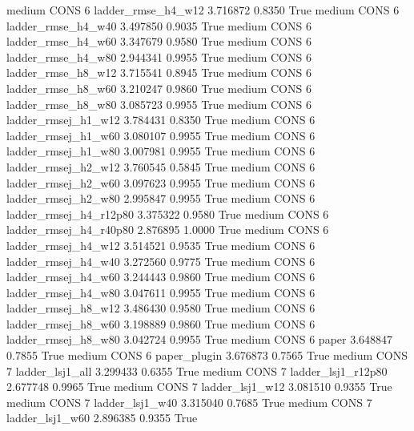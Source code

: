     medium     CONS                 6     ladder_rmse_h4_w12   3.716872      0.8350    True
    medium     CONS                 6     ladder_rmse_h4_w40   3.497850      0.9035    True
    medium     CONS                 6     ladder_rmse_h4_w60   3.347679      0.9580    True
    medium     CONS                 6     ladder_rmse_h4_w80   2.944341      0.9955    True
    medium     CONS                 6     ladder_rmse_h8_w12   3.715541      0.8945    True
    medium     CONS                 6     ladder_rmse_h8_w60   3.210247      0.9860    True
    medium     CONS                 6     ladder_rmse_h8_w80   3.085723      0.9955    True
    medium     CONS                 6    ladder_rmsej_h1_w12   3.784431      0.8350    True
    medium     CONS                 6    ladder_rmsej_h1_w60   3.080107      0.9955    True
    medium     CONS                 6    ladder_rmsej_h1_w80   3.007981      0.9955    True
    medium     CONS                 6    ladder_rmsej_h2_w12   3.760545      0.5845    True
    medium     CONS                 6    ladder_rmsej_h2_w60   3.097623      0.9955    True
    medium     CONS                 6    ladder_rmsej_h2_w80   2.995847      0.9955    True
    medium     CONS                 6 ladder_rmsej_h4_r12p80   3.375322      0.9580    True
    medium     CONS                 6 ladder_rmsej_h4_r40p80   2.876895      1.0000    True
    medium     CONS                 6    ladder_rmsej_h4_w12   3.514521      0.9535    True
    medium     CONS                 6    ladder_rmsej_h4_w40   3.272560      0.9775    True
    medium     CONS                 6    ladder_rmsej_h4_w60   3.244443      0.9860    True
    medium     CONS                 6    ladder_rmsej_h4_w80   3.047611      0.9955    True
    medium     CONS                 6    ladder_rmsej_h8_w12   3.486430      0.9580    True
    medium     CONS                 6    ladder_rmsej_h8_w60   3.198889      0.9860    True
    medium     CONS                 6    ladder_rmsej_h8_w80   3.042724      0.9955    True
    medium     CONS                 6                  paper   3.648847      0.7855    True
    medium     CONS                 6           paper_plugin   3.676873      0.7565    True
    medium     CONS                 7        ladder_lsj1_all   3.299433      0.6355    True
    medium     CONS                 7     ladder_lsj1_r12p80   2.677748      0.9965    True
    medium     CONS                 7        ladder_lsj1_w12   3.081510      0.9355    True
    medium     CONS                 7        ladder_lsj1_w40   3.315040      0.7685    True
    medium     CONS                 7        ladder_lsj1_w60   2.896385      0.9355    True
